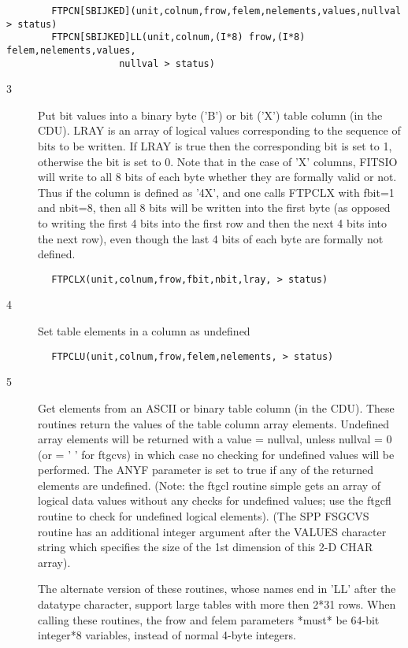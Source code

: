 \documentclass[11pt]{book}
\begin{document}
\begin{verbatim}
        FTPCN[SBIJKED](unit,colnum,frow,felem,nelements,values,nullval > status)
        FTPCN[SBIJKED]LL(unit,colnum,(I*8) frow,(I*8) felem,nelements,values,
	                nullval > status)
\end{verbatim}

\begin{description}
\item[3 ] Put bit values into a binary byte ('B') or bit ('X') table column (in the
    CDU).  LRAY is an array of logical values corresponding to the sequence of
    bits to be written.  If LRAY is true then the corresponding bit is
    set to 1, otherwise the bit is set to 0.  Note that in the case of
    'X' columns, FITSIO will write to all 8 bits of each byte whether
    they are formally valid or not.  Thus if the column is defined as
    '4X', and one calls FTPCLX with  fbit=1 and nbit=8, then all 8 bits
    will be written into the first byte (as opposed to writing the
    first 4 bits into the first row and then the next 4 bits into the
    next row), even though the last 4 bits of each byte are formally
   not defined.
\end{description}

\begin{verbatim}
        FTPCLX(unit,colnum,frow,fbit,nbit,lray, > status)
\end{verbatim}

\begin{description}
\item[4 ] Set table elements in a column as undefined
\end{description}

\begin{verbatim}
        FTPCLU(unit,colnum,frow,felem,nelements, > status)
\end{verbatim}

\begin{description}
\item[5 ] Get elements from an ASCII or binary table column (in the CDU).  These
    routines return the values of the table column array elements.  Undefined
    array elements will be returned with a value = nullval, unless nullval = 0
    (or = ' ' for ftgcvs) in which case no checking for undefined values will
    be performed. The ANYF parameter is set to true if any of the returned
    elements are undefined. (Note: the ftgcl routine simple gets an array
    of logical data values without any checks for undefined values;  use
    the ftgcfl routine to check for undefined logical elements).
    (The SPP FSGCVS routine has an additional integer argument after
    the VALUES character string which specifies the size of the 1st
    dimension of this 2-D CHAR array).

    The alternate version of these routines, whose names end in 'LL'
    after the datatype character, support large tables with more then
    2*31 rows.  When calling these routines, the frow and felem parameters
   *must* be 64-bit integer*8 variables, instead of normal 4-byte integers.
\end{description}
\end{document}
